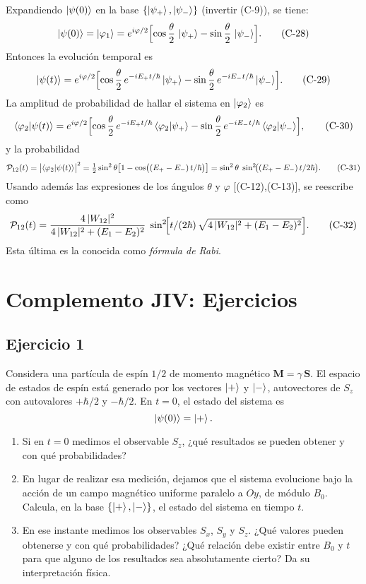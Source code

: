 \documentclass[a4paper,11pt]{article}
\begin{document}
Expandiendo \(\ket{\psi(0)}\) en la base \(\{\ket{\psi_+},\ket{\psi_-}\}\) (invertir (C-9)), se tiene:
\[
\ket{\psi(0)} = \ket{\varphi_1}
= e^{i\varphi/2}\Bigl[\cos\frac{\theta}{2}\,\ket{\psi_+}
                 -\sin\frac{\theta}{2}\,\ket{\psi_-}\Bigr].
\tag{C-28}
\]
Entonces la evolución temporal es
\[
\ket{\psi(t)}
= e^{i\varphi/2}\Bigl[\cos\frac{\theta}{2}\,e^{-iE_+t/\hbar}\ket{\psi_+}
                      -\sin\frac{\theta}{2}\,e^{-iE_-t/\hbar}\ket{\psi_-}\Bigr].
\tag{C-29}
\]
La amplitud de probabilidad de hallar el sistema en \(\ket{\varphi_2}\) es
\[
\braket{\varphi_2|\psi(t)}
= e^{i\varphi/2}\Bigl[\cos\frac{\theta}{2}\,e^{-iE_+t/\hbar}\braket{\varphi_2|\psi_+}
                     -\sin\frac{\theta}{2}\,e^{-iE_-t/\hbar}\braket{\varphi_2|\psi_-}\Bigr],
\tag{C-30}
\]
y la probabilidad
\[
\mathcal{P}_{12}(t) = \bigl|\braket{\varphi_2|\psi(t)}\bigr|^2
= \tfrac12\sin^2\theta\bigl[1-\cos\bigl((E_+ - E_-)\,t/\hbar\bigr)\bigr]
= \sin^2\theta\;\sin^2\!\bigl((E_+ - E_-)\,t/2\hbar\bigr).
\tag{C-31}
\]
Usando además las expresiones de los ángulos \(\theta\) y \(\varphi\) [(C-12),(C-13)], se reescribe como
\[
\mathcal{P}_{12}(t)
= \frac{4\,|W_{12}|^2}{4\,|W_{12}|^2 + (E_1 - E_2)^2}
  \;\sin^2\!\Bigl[t/(2\hbar)\,\sqrt{4\,|W_{12}|^2 + (E_1 - E_2)^2}\Bigr].
\tag{C-32}
\]
Esta última es la conocida como \emph{fórmula de Rabi}.

\section*{Complemento JIV: Ejercicios}

\subsection*{Ejercicio 1}
Considera una partícula de espín $1/2$ de momento magnético $\mathbf{M}=\gamma\,\mathbf{S}$. El espacio de estados de espín está generado por los vectores $\ket{+}$ y $\ket{-}$, autovectores de $S_z$ con autovalores $+\hbar/2$ y $-\hbar/2$. En $t=0$, el estado del sistema es
\[
\ket{\psi(0)}=\ket{+}.
\]
\begin{enumerate}
  \item Si en $t=0$ medimos el observable $S_z$, ¿qué resultados se pueden obtener y con qué probabilidades?
  \item En lugar de realizar esa medición, dejamos que el sistema evolucione bajo la acción de un campo magnético uniforme paralelo a $Oy$, de módulo $B_0$. Calcula, en la base $\{\ket{+},\ket{-}\}$, el estado del sistema en tiempo $t$.
  \item En ese instante medimos los observables $S_x$, $S_y$ y $S_z$. ¿Qué valores pueden obtenerse y con qué probabilidades? ¿Qué relación debe existir entre $B_0$ y $t$ para que alguno de los resultados sea absolutamente cierto? Da su interpretación física.
\end{enumerate}
\end{document}
